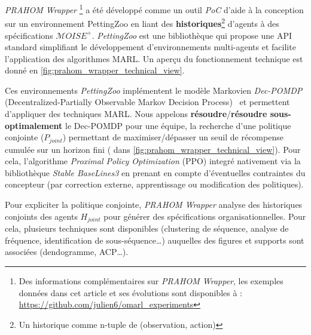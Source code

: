\documentclass[demonstration]{jfsma}
\begin{document}
\emph{PRAHOM Wrapper}\label{PettingZoo-wrapper}
\footnote{Des informations complémentaires sur \emph{PRAHOM Wrapper}, les exemples données dans cet article et ses évolutions sont disponibles à : \url{https://github.com/julien6/omarl_experiments}}
a été développé comme un outil \emph{PoC} d'aide à la conception sur un environnement PettingZoo en liant des \textbf{historiques}\footnote{Un historique comme n-tuple de (observation, action)} d'agents à des spécifications $\mathcal{M}OISE^+$. \emph{PettingZoo} est une bibliothèque qui propose une API standard simplifiant le développement d'environnements multi-agents et facilite l'application des algorithmes MARL. Un aperçu du fonctionnement technique est donné en \autoref{fig:prahom_wrapper_technical_view}.

Ces environnements \emph{PettingZoo} implémentent le modèle Markovien \emph{Dec-POMDP} (Decentralized-Partially Observable Markov Decision Process)~\cite{Oliehoek2016} et permettent d'appliquer des techniques MARL. 
Nous appelons \textbf{résoudre}/\textbf{résoudre sous-optimalement} le Dec-POMDP pour une équipe, la recherche d'une politique conjointe ($P_{joint}$) permettant de maximiser/dépasser un seuil de récompense cumulée sur un horizon fini ( dans \autoref{fig:prahom_wrapper_technical_view}). Pour cela, l'algorithme \emph{Proximal Policy Optimization} (PPO) integré nativement via la bibliothèque \emph{Stable BaseLines3} en prenant en compte d'éventuelles contraintes du concepteur (par correction externe, apprentissage ou modification des politiques).

Pour expliciter la politique conjointe, \emph{PRAHOM Wrapper} analyse des historiques conjoints des agents $H_{joint}$ pour générer des spécifications organisationnelles. Pour cela, plusieurs techniques sont disponibles (clustering de séquence, analyse de fréquence, identification de sous-séquence\dots) auquelles des figures et supports sont associées (dendogramme, ACP\dots).

\end{document}
